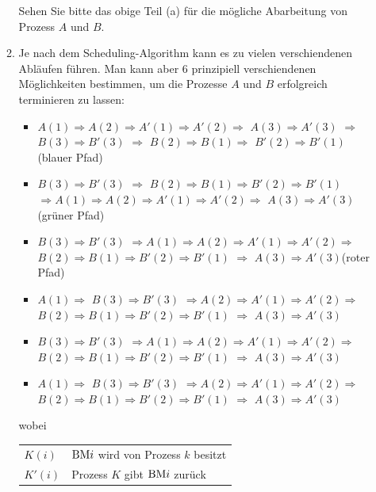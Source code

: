 \begin{enumerate}[label={Aufgabe H\arabic*},start=23]
\begin{enumerate}
				Sehen Sie bitte das obige Teil (a) für die mögliche Abarbeitung von Prozess $A$ und $B$.
			\pagebreak
			\item Je nach dem Scheduling-Algorithm kann es zu vielen verschiendenen Abläufen führen. Man kann aber 6 prinzipiell verschiendenen Möglichkeiten bestimmen, um die Prozesse $A$ und $B$ erfolgreich terminieren zu lassen:
				\begin{itemize}
					\footnotesize
					\item $A(1) \Rightarrow A(2) \Rightarrow A'(1) \Rightarrow A'(2) \Rightarrow$ \colorbox{green!30}{$A(3) \Rightarrow A'(3)$} $\Rightarrow$  \colorbox{red!30}{$B(3) \Rightarrow B'(3)$} $\Rightarrow$ \colorbox{blue!20}{$B(2) \Rightarrow B(1) \Rightarrow$} \colorbox{blue!20}{$B'(2) \Rightarrow B'(1)$} \hfill (blauer Pfad)
					\item \colorbox{red!30}{$B(3) \Rightarrow B'(3)$} $\Rightarrow$ \colorbox{blue!20}{$B(2) \Rightarrow B(1) \Rightarrow B'(2) \Rightarrow B'(1)$} $\Rightarrow A(1) \Rightarrow A(2) \Rightarrow A'(1) \Rightarrow A'(2) \Rightarrow$  \colorbox{green!30}{$A(3) \Rightarrow A'(3)$} \hfill (grüner Pfad)
					\item \colorbox{red!30}{$B(3) \Rightarrow B'(3)$} $ \Rightarrow A(1) \Rightarrow A(2) \Rightarrow A'(1) \Rightarrow A'(2) \Rightarrow $ \colorbox{blue!20}{$B(2) \Rightarrow B(1) \Rightarrow B'(2) \Rightarrow B'(1)$} $\Rightarrow$  \colorbox{green!30}{$A(3) \Rightarrow A'(3)$}\hfill (roter Pfad)
					\item $A(1) \Rightarrow $  \colorbox{red!30}{$B(3) \Rightarrow B'(3)$} $\Rightarrow A(2) \Rightarrow A'(1) \Rightarrow A'(2) \Rightarrow$ \colorbox{blue!20}{$B(2) \Rightarrow B(1) \Rightarrow B'(2) \Rightarrow B'(1)$} $\Rightarrow$  \colorbox{green!30}{$A(3) \Rightarrow A'(3)$}
					\item \colorbox{red!30}{$B(3) \Rightarrow B'(3)$} $\Rightarrow A(1) \Rightarrow A(2) \Rightarrow A'(1) \Rightarrow A'(2) \Rightarrow$ \colorbox{blue!20}{$B(2) \Rightarrow B(1) \Rightarrow B'(2) \Rightarrow B'(1)$} $\Rightarrow$  \colorbox{green!30}{$A(3) \Rightarrow A'(3)$}
					\item $A(1) \Rightarrow $  \colorbox{red!30}{$B(3) \Rightarrow B'(3)$} $ \Rightarrow A(2) \Rightarrow A'(1) \Rightarrow A'(2) \Rightarrow$ \colorbox{blue!20}{$B(2) \Rightarrow B(1) \Rightarrow B'(2) \Rightarrow B'(1)$} $\Rightarrow$  \colorbox{green!30}{$A(3) \Rightarrow A'(3)$}
				\end{itemize}
			wobei
				\begin{center}
					\begin{tabular}{@{}lp{5cm}@{}}
						$K(i)$ & $\text{BM} i$ wird von Prozess $k$ besitzt \\
						$K'(i)$ & Prozess $K$ gibt $\text{BM} i$ zurück
					\end{tabular}
				\end{center}


\end{enumerate}
\end{enumerate}
